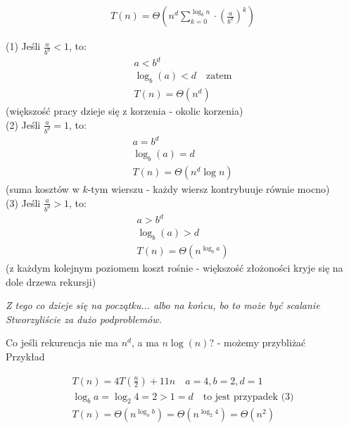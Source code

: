 \documentclass{article}
\begin{document}
\begin{align}
    T(n) = \Theta\left(n^d \sum_{k=0}^{\log_b n} \cdot \left(\frac{a}{b^d}\right)^k \right)
\end{align}

\noindent
(1) Jeśli $\frac{a}{b^d} < 1$, to:
\begin{align}
    a < b^d \\
    \log_b (a) < d \quad \text{zatem} \\
    T(n) = \Theta(n^d)
\end{align}
(większość pracy dzieje się z korzenia - okolic korzenia)\\

\noindent
(2) Jeśli $\frac{a}{b^d} = 1$, to:
\begin{align}
    a = b^d \\
    \log_b (a) = d \\
    T(n) = \Theta(n^d \log n)
\end{align}
(suma kosztów w $k$-tym wierszu - każdy wiersz kontrybuuje równie mocno)\\

\noindent
(3) Jeśli $\frac{a}{b^d} > 1$, to:
\begin{align}
    a > b^d \\
    \log_b (a) > d \\
    T(n) = \Theta(n^{\log_b a})
\end{align}
(z każdym kolejnym poziomem koszt rośnie - większość złożoności kryje się na dole drzewa rekursji)

\vspace{1cm}

\textit{Z tego co dzieje się na początku... albo na końcu, bo to może być scalanie}\\
\textit{Stworzyliście za dużo podproblemów.}
    
\vspace{1cm}

\noindent
Co jeśli rekurencja nie ma $n^d$, a ma $n\log(n)$? - możemy przybliżać\\

\noindent
Przykład

\begin{align}
    T(n) = 4 T\left(\frac{n}{2}\right) + 11 n \quad a=4, b=2, d=1\\
    \log_b a = \log_2 4 = 2 > 1 = d \quad \text{to jest przypadek (3)}\\
    T(n) = \Theta\left(n^{\log_a b}\right) = \Theta\left(n^{\log_2 4}\right) = \Theta\left(n^2\right)
\end{align}
\end{document}
